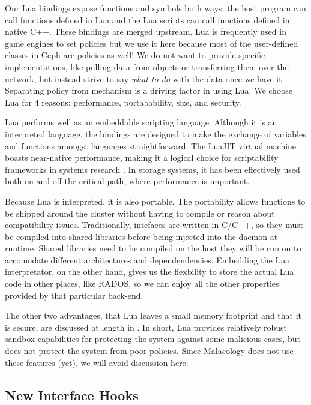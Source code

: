 \documentclass[10pt,twocolumn]{article}
\begin{document}
Our Lua bindings expose functions and symbols both ways; the host
program can call functions defined in Lua and the Lua scripts can call
functions defined in native C++. These bindings are merged upstream. Lua
is frequently used in game engines to set policies but we use it here
because most of the user-defined classes in Ceph are policies as well!
We do not want to provide specific implementations, like pulling data
from objects or transferring them over the network, but instead strive
to say \emph{what to do} with the data once we have it. Separating
policy from mechanism is a driving factor in using Lua. We choose Lua
for 4 reasons: performance, portabability, size, and security.

Lua performs well as an embeddable scripting language. Although it is an
interpreted language, the bindings are designed to make the exchange of
variables and functions amongst languages straightforward. The LuaJIT
virtual machine boasts near-native performance, making it a logical
choice for scriptability frameworks in systems research
\cite{neto:dls14-luaos}. In storage systems, it has been effectively
used both on \cite{grawinkel:pdsw2012-lua,watkins2013:bdmc13-in-vivo} and off
\cite{sevilla:sc15-mantle} the critical path, where performance is
important.

Because Lua is interpreted, it is also portable. The portability allows
functions to be shipped around the cluster without having to compile or
reason about compatibility issues. Traditionally, intefaces are written
in C/C++, so they must be compiled into shared libraries before being
injected into the daemon at runtime. Shared libraries need to be
compiled on the host they will be run on to accomodate different
architectures and dependendencies. Embedding the Lua interpretator, on
the other hand, gives us the flexbility to store the actual Lua code in
other places, like RADOS, so we can enjoy all the other properties
provided by that particular back-end.

The other two advantages, that Lua leaves a small memory footprint and
that it is secure, are discussed at length in 
\cite{ierusalimschy_programming_2006,neto:dls14-luaos}. In short, Lua
provides relatively robust sandbox capabilities for protecting the
system against some malicious cases, but does not protect the system
from poor policies. Since Malacology does not use these features (yet),
we will avoid discussion here.

\subsection{New Interface Hooks}\label{new-interface-hooks}
\end{document}
